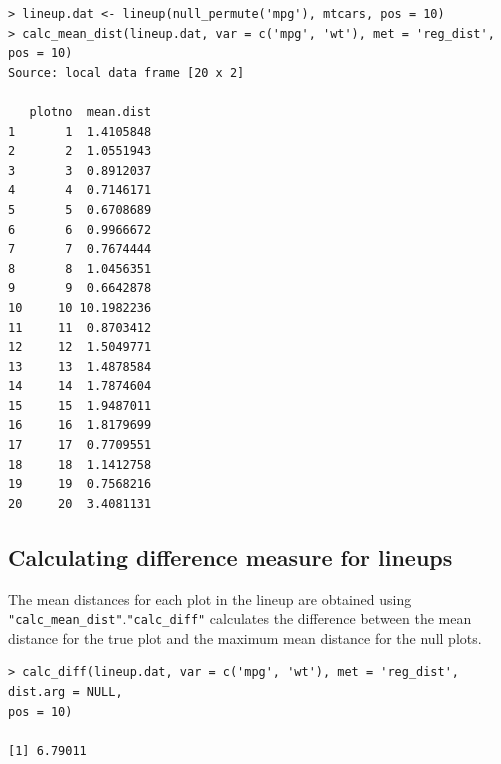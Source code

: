 \documentclass[article]{jss}
\begin{document}
\begin{verbatim}
> lineup.dat <- lineup(null_permute('mpg'), mtcars, pos = 10)
> calc_mean_dist(lineup.dat, var = c('mpg', 'wt'), met = 'reg_dist', pos = 10)
Source: local data frame [20 x 2]

   plotno  mean.dist
1       1  1.4105848
2       2  1.0551943
3       3  0.8912037
4       4  0.7146171
5       5  0.6708689
6       6  0.9966672
7       7  0.7674444
8       8  1.0456351
9       9  0.6642878
10     10 10.1982236
11     11  0.8703412
12     12  1.5049771
13     13  1.4878584
14     14  1.7874604
15     15  1.9487011
16     16  1.8179699
17     17  0.7709551
18     18  1.1412758
19     19  0.7568216
20     20  3.4081131
\end{verbatim}

\subsection{Calculating difference measure for
lineups}\label{calculating-difference-measure-for-lineups}

The mean distances for each plot in the lineup are obtained using
\texttt{"calc\_mean\_dist"}.\texttt{"calc\_diff"} calculates the
difference between the mean distance for the true plot and the maximum
mean distance for the null plots.

%

\begin{verbatim}
> calc_diff(lineup.dat, var = c('mpg', 'wt'), met = 'reg_dist', dist.arg = NULL, 
pos = 10)

[1] 6.79011
\end{verbatim}
\end{document}

